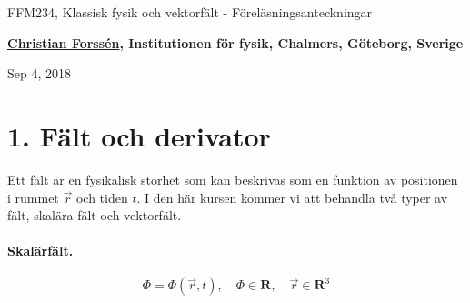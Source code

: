 \documentclass[%
oneside,                 %
final,                   %
10pt]{article}
\begin{document}

\newcommand{\exercisesection}[1]{\subsection*{#1}}







\thispagestyle{empty}

\begin{center}
{\LARGE\bf
\begin{spacing}{1.25}
FFM234, Klassisk fysik och vektorfält - Föreläsningsanteckningar
\end{spacing}
}
\end{center}


\begin{center}
{\bf \href{{http://fy.chalmers.se/subatom/tsp/}}{Christian Forssén}, Institutionen för fysik, Chalmers, Göteborg, Sverige${}^{}$} \\ [0mm]
\end{center}

\begin{center}
\end{center}
    

\begin{center}
Sep 4, 2018
\end{center}

\vspace{1cm}


\section*{1. Fält och derivator}

Ett fält är en fysikalisk storhet som kan beskrivas som en funktion av
positionen i rummet $\vec{r}$ och tiden $t$.  I den här kursen kommer vi
att behandla två typer av fält, skalära fält och vektorfält.

\paragraph{Skalärfält.}
\begin{equation}
\Phi = \Phi(\vec{r},t), \quad \Phi \in \mathbf{R},\quad \vec{r} \in \mathbf{R}^3
\end{equation}
\end{document}
